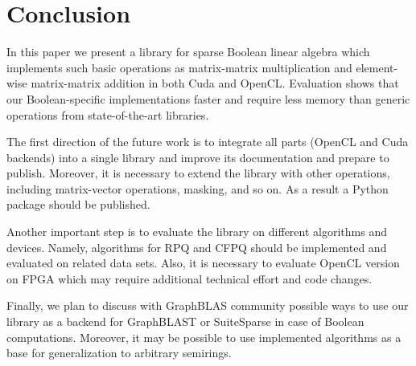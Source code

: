 \section{Conclusion}

In this paper we present a library for sparse Boolean linear algebra which implements such basic operations as matrix-matrix multiplication and element-wise matrix-matrix addition in both Cuda and OpenCL.
Evaluation shows that our Boolean-specific implementations faster and require less memory than generic operations from state-of-the-art libraries.

The first direction of the future work is to integrate all parts (OpenCL and Cuda backends) into a single library and improve its documentation and prepare to publish.
Moreover, it is necessary to extend the library with other operations, including matrix-vector operations, masking, and so on.
As a result a Python package should be published.

Another important step is to evaluate the library on different algorithms and devices.
Namely, algorithms for RPQ and CFPQ should be implemented and evaluated on related data sets.
Also, it is necessary to evaluate OpenCL version on FPGA which may require additional technical effort and code changes.

Finally, we plan to discuss with GraphBLAS community possible ways to use our library as a backend for GraphBLAST or SuiteSparse in case of Boolean computations.
Moreover, it may be possible to use implemented algorithms as a base for generalization to arbitrary semirings.
